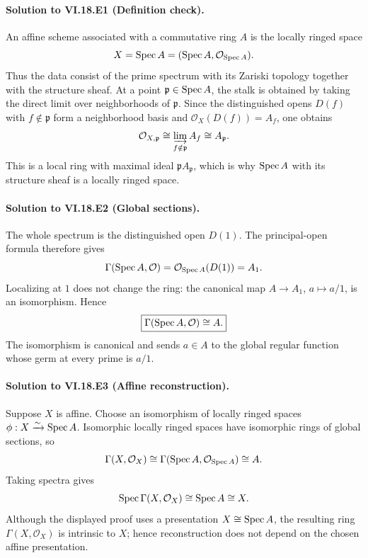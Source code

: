 
\paragraph{Solution to VI.18.E1 (Definition check).}
\begin{solution}
An affine scheme associated with a commutative ring $A$ is the locally ringed space
\[
X=\operatorname{Spec} A=(\operatorname{Spec} A,\mathcal O_{\operatorname{Spec} A}).
\]
Thus the data consist of the prime spectrum with its Zariski topology together with the structure sheaf.  At a point $\mathfrak p\in\operatorname{Spec} A$, the stalk is obtained by taking the direct limit over neighborhoods of $\mathfrak p$.  Since the distinguished opens $D(f)$ with $f\notin\mathfrak p$ form a neighborhood basis and
\(\mathcal O_X(D(f))=A_f\), one obtains
\[
\mathcal O_{X,\mathfrak p}\cong\varinjlim_{f\notin\mathfrak p}A_f\cong A_{\mathfrak p}.
\]
This is a local ring with maximal ideal $\mathfrak pA_{\mathfrak p}$, which is why $\operatorname{Spec} A$ with its structure sheaf is a locally ringed space.
\end{solution}

\paragraph{Solution to VI.18.E2 (Global sections).}
\begin{solution}
The whole spectrum is the distinguished open $D(1)$.  The principal-open formula therefore gives
\[
\Gamma(\operatorname{Spec} A,\mathcal O)=\mathcal O_{\operatorname{Spec} A}(D(1))=A_1.
\]
Localizing at $1$ does not change the ring: the canonical map $A\to A_1$, $a\mapsto a/1$, is an isomorphism. Hence
\[
\boxed{\Gamma(\operatorname{Spec} A,\mathcal O)\cong A.}
\]
The isomorphism is canonical and sends $a\in A$ to the global regular function whose germ at every prime is $a/1$.
\end{solution}

\paragraph{Solution to VI.18.E3 (Affine reconstruction).}
\begin{solution}
Suppose $X$ is affine. Choose an isomorphism of locally ringed spaces
\(\phi:X\xrightarrow{\sim}\operatorname{Spec} A\).  Isomorphic locally ringed spaces have isomorphic rings of global sections, so
\[
\Gamma(X,\mathcal O_X)\cong\Gamma(\operatorname{Spec} A,\mathcal O_{\operatorname{Spec} A})\cong A.
\]
Taking spectra gives
\[
\operatorname{Spec}\Gamma(X,\mathcal O_X)\cong\operatorname{Spec} A\cong X.
\]
Although the displayed proof uses a presentation $X\cong\operatorname{Spec} A$, the resulting ring $\Gamma(X,\mathcal O_X)$ is intrinsic to $X$; hence reconstruction does not depend on the chosen affine presentation.
\end{solution}

